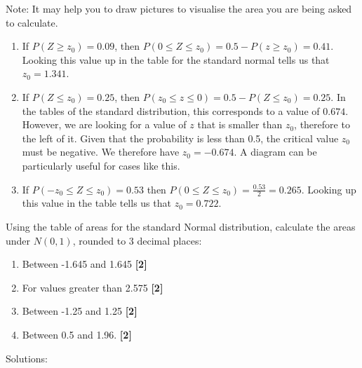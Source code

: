 \documentclass[a4paper, leqno, 12pt]{article} %
\newenvironment{top_enumerate}{
\begin{enumerate}
  \setlength{\itemsep}{2em}
  \setlength{\topsep}{-0pt}
  \setlength{\partopsep}{-0pt}
}{\end{enumerate}}
\begin{document}
\begin{top_enumerate}
Note: It may help you to draw pictures to visualise the area you are being asked to calculate.
 
\setcounter{equation}{0}  %
\begin{enumerate}
	\setlength{\topsep}{-0pt}
	\setlength{\partopsep}{-0pt}
	\setlength{\itemsep}{10pt}
			\item If $P(Z \ge z_0) = {0.09}$, then $P(0 \le Z \le z_0)  = 0.5 - P(z \ge z_0) = {0.41}$. Looking this value up in the table for the standard normal tells us that $z_0 = {1.341}$.
	 \quad \textbf{}
		\item If $P(Z \le z_0) = {0.25}$, then $P(z_0 \le z \le 0) = 0.5 - P(Z \le z_0) = {0.25}$. In the tables of the standard distribution, this corresponds to a value of ${0.674}$. However, we are looking for a value of $z$ that is smaller than $z_0$, therefore to the left of it. Given that the probability is less than 0.5, the critical value $z_0$ must be negative. We therefore have $z_0 = -{0.674}$. A diagram can be particularly useful for cases like this.
	 \quad \textbf{}
		\item If $P(-z_0 \le Z \le z_0) = {0.53}$ then $P(0 \le Z \le z_0) = \frac{{0.53}}{2} = {0.265}$. Looking up this value in the table tells us that $z_0 = {0.722}$.
	 \quad \textbf{}
\end{enumerate}\newpage
\item Using the table of areas for the standard Normal distribution, calculate the areas under $N(0,1)$, rounded to 3 decimal places:
 
\setcounter{equation}{0}  %
\begin{enumerate}
	\setlength{\topsep}{-0pt}
	\setlength{\partopsep}{-0pt}
	\setlength{\itemsep}{10pt}
			\item Between {-1.645} and {1.645}
	 \quad \textbf{[2]}
		\item For values greater than {2.575}
	 \quad \textbf{[2]}
		\item Between {-1.25} and {1.25}
	 \quad \textbf{[2]}
		\item Between {0.5} and {1.96}.
	 \quad \textbf{[2]}
\end{enumerate}\addtocounter{enumi}{-1}
\item Solutions:
 

\end{top_enumerate}
\end{document}
